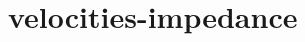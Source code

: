 \documentclass[9pt]{beamer}
\newcommand{\partderi}[2]{\frac{\partial#1}{\partial#2}}
\begin{document}
\begin{frame}
\begin{minipage}{\linewidth}
  \end{minipage} %
%     

\end{frame}

\section{velocities-impedance}
\end{document}
